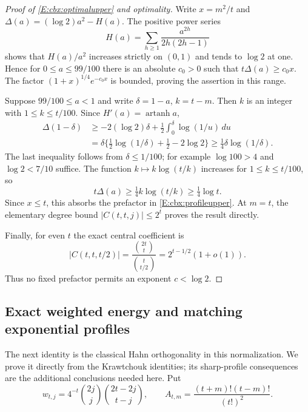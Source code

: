 \documentclass[11pt,a4paper]{article}
\theoremstyle{definition}
\theoremstyle{remark}
\numberwithin{equation}{section}
\begin{document}
\begin{proof}[Proof of \eqref{E:cbx:optimalupper} and optimality]
Write $x=m^2/t$ and
$\Delta(a)=(\log2)a^2-H(a)$. The positive power series
\[
 H(a)=\sum_{h\ge1}\frac{a^{2h}}{2h(2h-1)}
\]
shows that $H(a)/a^2$ increases strictly on $(0,1)$ and tends to
$\log2$ at one. Hence for $0\le a\le99/100$ there is an absolute
$c_0>0$ such that $t\Delta(a)\ge c_0x$. The factor
$(1+x)^{1/4}e^{-c_0x}$ is bounded, proving the assertion in this range.

Suppose $99/100\le a<1$ and write $\delta=1-a$, $k=t-m$.
Then $k$ is an integer with $1\le k\le t/100$. Since
$H'(a)=\operatorname{artanh}a$,
\begin{align*}
 \Delta(1-\delta)
 &\ge -2(\log2)\delta
            +\tfrac12\int_0^\delta\log(1/u)\,du\\
 &=\delta\{\tfrac12\log(1/\delta)+\tfrac12-2\log2\}
 \ge\tfrac14\delta\log(1/\delta).
\end{align*}
The last inequality follows from $\delta\le1/100$; for example
$\log100>4$ and $\log2<7/10$ suffice. The function
$k\mapsto k\log(t/k)$ increases for $1\le k\le t/100$, so
\[
 t\Delta(a)\ge\tfrac14 k\log(t/k)\ge\tfrac14\log t.
\]
Since $x\le t$, this absorbs the prefactor in
\eqref{E:cbx:profileupper}. At $m=t$, the elementary degree bound
$|C(t,t,j)|\le2^t$ proves the result directly.

Finally, for even $t$ the exact central coefficient is
\[
 |C(t,t,t/2)|=\frac{\binom{2t}{t}}{\binom t{t/2}}
                 =2^{t-1/2}(1+o(1)).
\]
Thus no fixed prefactor permits an exponent $c<\log2$.
\end{proof}

\subsection{Exact weighted energy and matching exponential profiles}

The next identity is the classical Hahn orthogonality in this
normalization. We prove it directly from the Krawtchouk identities;
its sharp-profile consequences are the additional conclusions needed here.
Put
\[
 w_{t,j}=4^{-t}\binom{2j}{j}\binom{2t-2j}{t-j},\qquad
 A_{t,m}=\frac{(t+m)!(t-m)!}{(t!)^2}.
\]
\end{document}
